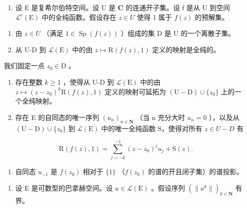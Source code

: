 \begin{enumerate}
\def\labelenumi{\arabic{enumi})}
\setcounter{enumi}{2}
\tightlist
\item
  设 E 是复希尔伯特空间。设 U 是 \(\mathbf{C}\) 的连通开子集。设 f 是从 U 到空间 \(\mathcal{L}^{c}(\mathrm{E})\) 中的全纯函数。假设存在 \(z \in U\) 使得 1 属于 \(f(z)\) 的预解集。
\end{enumerate}

\begin{enumerate}
\def\labelenumi{\alph{enumi})}
\item
  由 \(z \in U\) （满足 \(1 \in \operatorname{Sp}(f(z))\) ）组成的集 D 是 U 的一个离散子集。
\item
  从 U-D 到 \(\mathcal{L}(\mathrm{E})\) 中的由 \(z\mapsto \mathrm{R}(f(z),1)\) 定义的映射是全纯的。
\end{enumerate}

我们固定一点 \(z_0 \in \mathrm{D}\) 。

\begin{enumerate}
\def\labelenumi{\alph{enumi})}
\setcounter{enumi}{2}
\item
  存在整数 \(k \geqslant 1\) ，使得从 U-D 到 \(\mathcal{L}(\mathrm{E})\) 中的由 \(z \mapsto (z - z_{0})^{k}\mathrm{R}(f(z), 1)\) 定义的映射可延拓为 \((\mathrm{U}-\mathrm{D}) \cup \{z_{0}\}\) 上的一个全纯映射。
\item
  存在 E 的自同态的唯一序列 \((u_{n})_{n\in\mathbf{N}}\) （当 n 充分大时 \(u_{n}=0\) ），以及从 \((\mathrm{U}-\mathrm{D})\cup\{z_{0}\}\) 到 \(\mathcal{L}(\mathrm{E})\) 中的唯一全纯函数 S，使得对所有 \(z\in U-D\) 有
\end{enumerate}

\[
\mathrm{R} (f (z), 1) = \sum_ {j = - k} ^ {- 1} (z - z _ {0}) ^ {j} u _ {j} + \mathrm{S} (z).
\]

\begin{enumerate}
\def\labelenumi{\alph{enumi})}
\setcounter{enumi}{4}
\tightlist
\item
  自同态 \(u_{-1}\) 是 \(f(z_0)\) 相对于 \(\{1\}\) （\(f(z_0)\) 的谱的开且闭子集）的谱投影。
\end{enumerate}

\begin{enumerate}
\def\labelenumi{\arabic{enumi})}
\setcounter{enumi}{3}
\tightlist
\item
  设 E 是可数型的巴拿赫空间。设 \(u \in \mathcal{L}(\mathrm{E})\) 。假设序列 \((\| u^k \|)_{k \in \mathbf{N}}\) 有界。
\end{enumerate}

